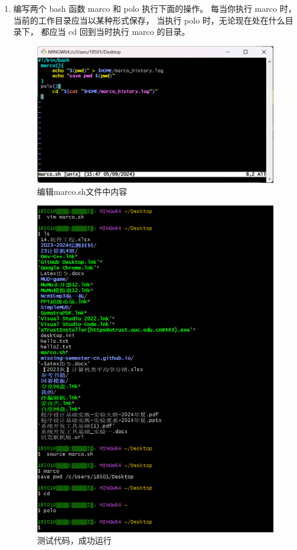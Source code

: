 \documentclass{ctexart}
\begin{document}
\begin{enumerate}
    \item 编写两个 bash 函数 marco 和 polo 执行下面的操作。 
    每当你执行 marco 时，当前的工作目录应当以某种形式保存，
    当执行 polo 时，无论现在处在什么目录下，
    都应当 cd 回到当时执行 marco 的目录。 
    \begin{figure}[H]
        \centering
        \includegraphics[width=14cm]{970751e5be9e298738cb2a7ab2044abe.png}
        \caption{编辑marco.sh文件中内容}
        \label{fig:1}
    \end{figure}
    \begin{figure}[H]
        \centering
        \includegraphics[width=14cm]{97009db96526e1ae888632d43c49af79.png}
        \caption{测试代码，成功运行}
        \label{fig:1}
    \end{figure}


\end{enumerate}
\end{document}
